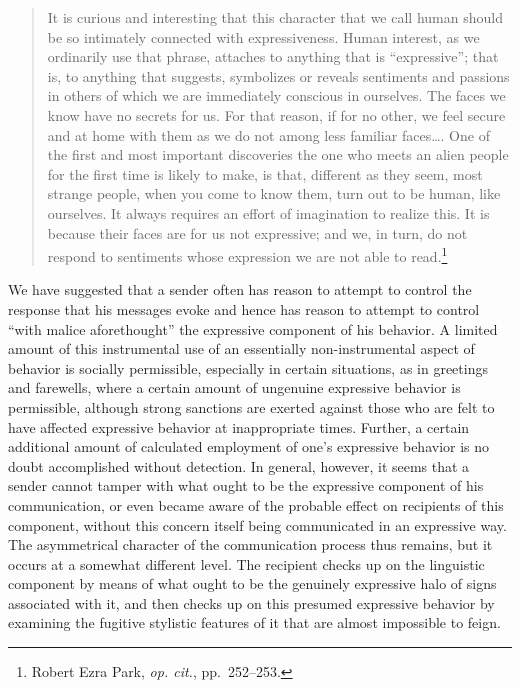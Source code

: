 \documentclass[openany,nobib]{tufte-book}
\begin{document}
\begin{quote}
It is curious and interesting that this character that we call human
should be so intimately connected with expres­siveness. Human interest,
as we ordinarily use that phrase, attaches to anything that is
``expressive''; that is, to any­thing that suggests, symbolizes or
reveals sentiments and passions in others of which we are immediately
conscious in ourselves. The faces we know have no secrets for us. For
that reason, if for no other, we feel secure and at home with them as we
do not among less familiar faces\ldots. One of the first and most
important discoveries the one who meets an alien people for the first
time is likely to make, is that, different as they seem, most strange
people, when you come to know them, turn out to be human, like
our­selves. It always requires an effort of imagination to realize this.
It is because their faces are for us not ex­pressive; and we, in turn, do
not respond to sentiments whose expression we are not able to
read.\footnote{Robert Ezra Park, \emph{op. cit.}, pp.~252--253.}
\end{quote}

\noindent We have suggested that a sender often has reason to at­tempt to control
the response that his messages evoke and hence has reason to attempt to
control ``with malice aforethought'' the expressive component of his
behavior. A limited amount of this instrumental use of an essentially
non-instrumental aspect of behavior is socially permissible, especially
in certain situa­tions, as in greetings and farewells, where a certain
amount of ungenuine expressive behavior is permissible, although strong
sanctions are exerted against those who are felt to have affected
expressive behavior at inappropriate times. Further, a certain
additional amount of calculated employment of one's expressive behavior
is no doubt accomplished without detection. In general, however, it
seems that a sender cannot tamper with what ought to be the expressive
component of his communication, or even became aware of the probable
effect on recipients of this component, without this concern itself
being communicated in an expressive way. The asymmetrical character of
the communication process thus remains, but it occurs at a somewhat
different level. The recipient checks up on the linguistic component by
means of what ought to be the genuinely expressive halo of signs
associated with it, and then checks up on this presumed expressive
behavior by examining the fugitive stylistic features of it that are
al­most impossible to feign.
\end{document}

